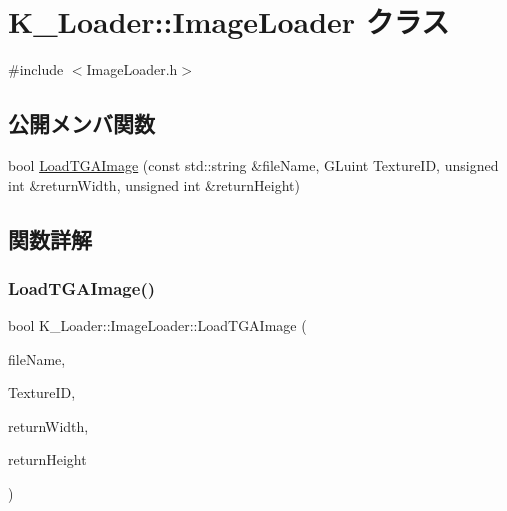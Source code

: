\hypertarget{class_k___loader_1_1_image_loader}{}\section{K\+\_\+\+Loader\+:\+:Image\+Loader クラス}
\label{class_k___loader_1_1_image_loader}


{\ttfamily \#include $<$Image\+Loader.\+h$>$}

\subsection*{公開メンバ関数}
\begin{DoxyCompactItemize}
\item 
bool \mbox{\hyperlink{class_k___loader_1_1_image_loader_abb787c887f0beceafa2d7f77a7fbb39f}{Load\+T\+G\+A\+Image}} (const std\+::string \&file\+Name, G\+Luint Texture\+ID, unsigned int \&return\+Width, unsigned int \&return\+Height)
\end{DoxyCompactItemize}


\subsection{関数詳解}
\mbox{\label{class_k___loader_1_1_image_loader_abb787c887f0beceafa2d7f77a7fbb39f}} 
\subsubsection{\texorpdfstring{Load\+T\+G\+A\+Image()}{LoadTGAImage()}}
{\footnotesize\ttfamily bool K\+\_\+\+Loader\+::\+Image\+Loader\+::\+Load\+T\+G\+A\+Image (\begin{DoxyParamCaption}\item[{const std\+::string \&}]{file\+Name,  }\item[{G\+Luint}]{Texture\+ID,  }\item[{unsigned int \&}]{return\+Width,  }\item[{unsigned int \&}]{return\+Height }\end{DoxyParamCaption})}

